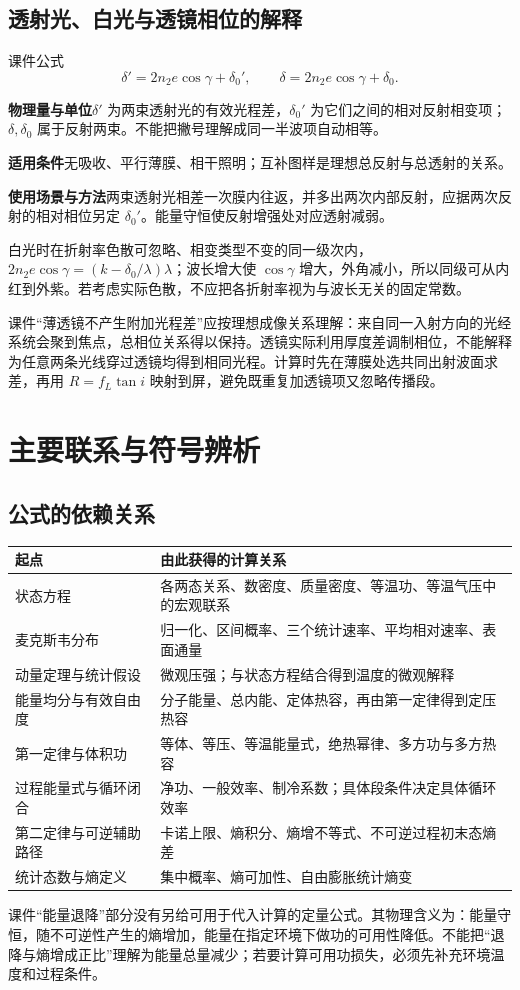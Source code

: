 \documentclass[UTF8,fontset=none,zihao=-4,a4paper]{ctexart}
\newcommand{\chapterpage}[1]{\clearpage\section{#1}}
\newcommand{\explain}[3]{\par\noindent\textbf{物理量与单位}\quad #1\par
\noindent\textbf{适用条件}\quad #2\par
\noindent\textbf{使用场景与方法}\quad #3\par}
\begin{document}
\subsection{透射光、白光与透镜相位的解释}
\begin{infobox}[breakable=false]{课件公式}
\[
 \delta'=2n_2e\cos\gamma+\delta_0',\qquad
 \delta=2n_2e\cos\gamma+\delta_0.
\]
\end{infobox}
\explain{$\delta'$ 为两束透射光的有效光程差，$\delta_0'$ 为它们之间的相对反射相变项；$\delta,\delta_0$ 属于反射两束。不能把撇号理解成同一半波项自动相等。}{无吸收、平行薄膜、相干照明；互补图样是理想总反射与总透射的关系。}{两束透射光相差一次膜内往返，并多出两次内部反射，应据两次反射的相对相位另定 $\delta_0'$。能量守恒使反射增强处对应透射减弱。}
白光时在折射率色散可忽略、相变类型不变的同一级次内，$2n_2e\cos\gamma=(k-\delta_0/\lambda)\lambda$；波长增大使 $\cos\gamma$ 增大，外角减小，所以同级可从内红到外紫。若考虑实际色散，不应把各折射率视为与波长无关的固定常数。

课件“薄透镜不产生附加光程差”应按理想成像关系理解：来自同一入射方向的光经系统会聚到焦点，总相位关系得以保持。透镜实际利用厚度差调制相位，不能解释为任意两条光线穿过透镜均得到相同光程。计算时先在薄膜处选共同出射波面求差，再用 $R=f_L\tan i$ 映射到屏，避免既重复加透镜项又忽略传播段。

\chapterpage{主要联系与符号辨析}

\subsection{公式的依赖关系}
\begin{center}\begin{tabularx}{\linewidth}{l Y}\toprule 起点 & 由此获得的计算关系\\\midrule
状态方程 & 各两态关系、数密度、质量密度、等温功、等温气压中的宏观联系\\
麦克斯韦分布 & 归一化、区间概率、三个统计速率、平均相对速率、表面通量\\
动量定理与统计假设 & 微观压强；与状态方程结合得到温度的微观解释\\
能量均分与有效自由度 & 分子能量、总内能、定体热容，再由第一定律得到定压热容\\
第一定律与体积功 & 等体、等压、等温能量式，绝热幂律、多方功与多方热容\\
过程能量式与循环闭合 & 净功、一般效率、制冷系数；具体段条件决定具体循环效率\\
第二定律与可逆辅助路径 & 卡诺上限、熵积分、熵增不等式、不可逆过程初末态熵差\\
统计态数与熵定义 & 集中概率、熵可加性、自由膨胀统计熵变\\\bottomrule\end{tabularx}\end{center}
课件“能量退降”部分没有另给可用于代入计算的定量公式。其物理含义为：能量守恒，随不可逆性产生的熵增加，能量在指定环境下做功的可用性降低。不能把“退降与熵增成正比”理解为能量总量减少；若要计算可用功损失，必须先补充环境温度和过程条件。
\end{document}
